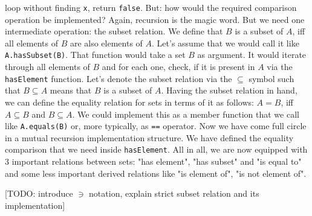 loop without finding \verb|x|, return \verb|false|. But: how would the required comparison operation be implemented? Again, recursion is the magic word. But we need one intermediate operation: the subset relation. We define that $B$ is a subset of $A$, iff all elements of $B$ are also elements of $A$. Let's assume that we would call it like \verb|A.hasSubset(B)|. That function would take a set $B$ as argument. It would iterate through all elements of $B$ and for each one, check, if it is present in $A$ via the \verb|hasElement| function. Let's denote the subset relation via the $\subseteq$ symbol such that $B \subseteq A$ means that $B$ is a subset of $A$. Having the subset relation in hand, we can define the equality relation for sets in terms of it as follows: $A = B$, iff $A \subseteq B$ and $B \subseteq A$. We could implement this as a member function that we call like \verb|A.equals(B)| or, more typically, as \verb|==| operator. Now we have come full circle in a mutual recursion implementation structure. We have defined the equality comparison that we need inside \verb|hasElement|. All in all, we are now equipped with 3 important relations between sets: "has element", "has subset" and "is equal to" and some less important derived relations like "is element of", "is not element of".

[TODO: introduce $\ni$ notation, explain strict subset relation and its implementation]





